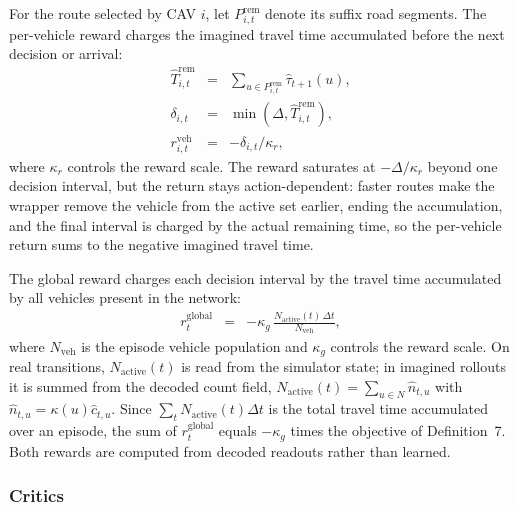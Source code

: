 For the route selected by CAV \(i\), let \(P_{i,t}^{\mathrm{rem}}\) denote
its suffix road segments.  The per-vehicle reward charges the imagined
travel time accumulated before the next decision or arrival:
\begin{equation}
\begin{array}{rcl}
\widehat T_{i,t}^{\mathrm{rem}}
&=&
\displaystyle
\sum_{u\in P_{i,t}^{\mathrm{rem}}}
\widehat\tau_{t+1}(u),\\[0.35em]
\delta_{i,t}
&=&
\min(\Delta,\widehat T_{i,t}^{\mathrm{rem}}),\\
r_{i,t}^{\mathrm{veh}}
&=&
-\delta_{i,t}/\kappa_r,
\end{array}
\end{equation}
where \(\kappa_r\) controls the reward scale.  The reward saturates at
\(-\Delta/\kappa_r\) beyond one decision interval, but the return stays
action-dependent: faster routes make the wrapper remove the vehicle from
the active set earlier, ending the accumulation, and the final interval is
charged by the actual remaining time, so the per-vehicle return sums to the
negative imagined travel time.

The global reward charges each decision interval by the travel time
accumulated by all vehicles present in the network:
\begin{equation}
\begin{array}{rcl}
r_t^{\mathrm{global}}
&=&
\displaystyle
-\kappa_g\,
\frac{N_{\mathrm{active}}(t)\,\Delta t}{N_{\mathrm{veh}}},
\end{array}
\end{equation}
where \(N_{\mathrm{veh}}\) is the episode vehicle population and
\(\kappa_g\) controls the reward scale.  On real transitions,
\(N_{\mathrm{active}}(t)\) is read from the simulator state; in imagined
rollouts it is summed from the decoded count field,
\(N_{\mathrm{active}}(t)=\sum_{u\in N}\widehat n_{t,u}\) with
\(\widehat n_{t,u}=\kappa(u)\hat c_{t,u}\).  Since
\(\sum_t N_{\mathrm{active}}(t)\Delta t\) is the total travel time
accumulated over an episode, the sum of \(r_t^{\mathrm{global}}\) equals
\(-\kappa_g\) times the objective of Definition~7.  Both rewards are
computed from decoded readouts rather than learned.

\subsubsection{Critics}

